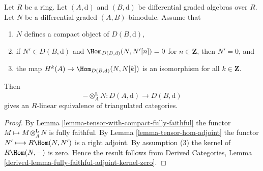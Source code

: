 \begin{lemma}
\label{lemma-tilting-equivalence}
Let $R$ be a ring. Let $(A, \text{d})$ and $(B, \text{d})$ be 
differential graded algebras over $R$. Let $N$ be a
differential graded $(A, B)$-bimodule. Assume that
\begin{enumerate}
\item $N$ defines a compact object of $D(B, \text{d})$,
\item if $N' \in D(B, \text{d})$ and
$\Hom_{D(B, \text{d})}(N, N'[n]) = 0$ for $n \in \mathbf{Z}$,
then $N' = 0$, and
\item the map $H^k(A) \to \Hom_{D(B, \text{d})}(N, N[k])$ is an
isomorphism for all $k \in \mathbf{Z}$.
\end{enumerate}
Then
$$
- \otimes_A^\mathbf{L} N : D(A, \text{d}) \to D(B, \text{d})
$$
gives an $R$-linear equivalence of triangulated categories.
\end{lemma}

\begin{proof}
By Lemma \ref{lemma-tensor-with-compact-fully-faithful}
the functor $M \longmapsto M \otimes_A^\mathbf{L} N$ is
fully faithful. By Lemma \ref{lemma-tensor-hom-adjoint}
the functor $N' \longmapsto R\Hom(N, N')$ is a right adjoint.
By assumption (3) the kernel of $R\Hom(N, -)$ is zero.
Hence the result follows from
Derived Categories, Lemma
\ref{derived-lemma-fully-faithful-adjoint-kernel-zero}.
\end{proof}
